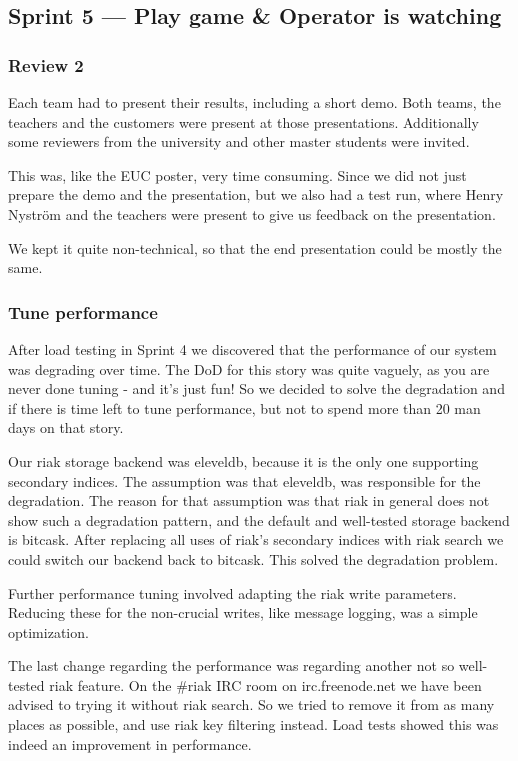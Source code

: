 \documentclass[11pt,a4paper]{report}
\begin{document}
\subsection*{Sprint 5 --- Play game \& Operator is watching}
\subsubsection{Review 2}
Each team had to present their results, including a short demo.
Both teams, the teachers and the customers were present at those presentations.
Additionally some reviewers from the university and other master students were invited.

This was, like the EUC poster, very time consuming.
Since we did not just prepare the demo and the presentation, but we also had a test run,
where Henry Nyström and the teachers were present to give us feedback on the presentation.

We kept it quite non-technical, so that the end presentation could be mostly the same.

\subsubsection{Tune performance}
After load testing in Sprint 4 we discovered that the performance of our system was degrading over time.
The DoD for this story was quite vaguely, as you are never done tuning - and it's just fun!
So we decided to solve the degradation and if there is time left to tune performance,
but not to spend more than 20 man days on that story.

Our riak storage backend was eleveldb, because it is the only one supporting secondary indices.
The assumption was that eleveldb, was responsible for the degradation.
The reason for that assumption was that riak in general does not show such a degradation pattern,
and the default and well-tested storage backend is bitcask.
After replacing all uses of riak's secondary indices with riak search we could switch our backend back to bitcask.
This solved the degradation problem.

Further performance tuning involved adapting the riak write parameters.
Reducing these for the non-crucial writes, like message logging, was a simple optimization.

The last change regarding the performance was regarding another not so well-tested riak feature.
On the \#riak IRC room on irc.freenode.net we have been advised to trying it without riak search.
So we tried to remove it from as many places as possible, and use riak key filtering instead.
Load tests showed this was indeed an improvement in performance.
\end{document}
